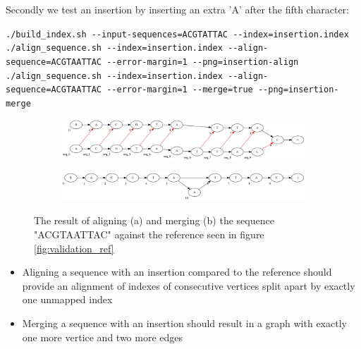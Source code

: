 \documentclass[thesis.tex]{subfiles}
\begin{document}
Secondly we test an insertion by inserting an extra 'A' after the fifth character:\\
\par\noindent
\texttt{./build\_index.sh -{}-input-sequences=ACGTATTAC -{}-index=insertion.index}\\
\texttt{./align\_sequence.sh -{}-index=insertion.index -{}-align-sequence=ACGTAATTAC -{}-error-margin=1 -{}-png=insertion-align}\\
\texttt{./align\_sequence.sh -{}-index=insertion.index -{}-align-sequence=ACGTAATTAC -{}-error-margin=1 -{}-merge=true -{}-png=insertion-merge}\\
\begin{figure}[!h]
  \begin{subfigure}[t]{\textwidth}
    \begin{mdframed}
      \includegraphics[width=\textwidth]{output/insertion-align.png}
    \end{mdframed}
    \subcaption{}
  \end{subfigure}
  \begin{subfigure}[t]{\textwidth}
    \begin{mdframed}
      \includegraphics[width=\textwidth]{output/insertion-merge.png}
    \end{mdframed}
    \subcaption{}
  \end{subfigure} 
  \caption{The result of aligning (a) and merging (b) the sequence "ACGTAATTAC" against the reference seen in figure \ref{fig:validation_ref}}
  \label{fig:validation_insertion}
\end{figure}
\begin{itemize}
\item Aligning a sequence with an insertion compared to the reference should provide an alignment of indexes of consecutive vertices split apart by exactly one unmapped index
\item Merging a sequence with an insertion should result in a graph with exactly one more vertice and two more edges
\end{itemize}
\end{document}

